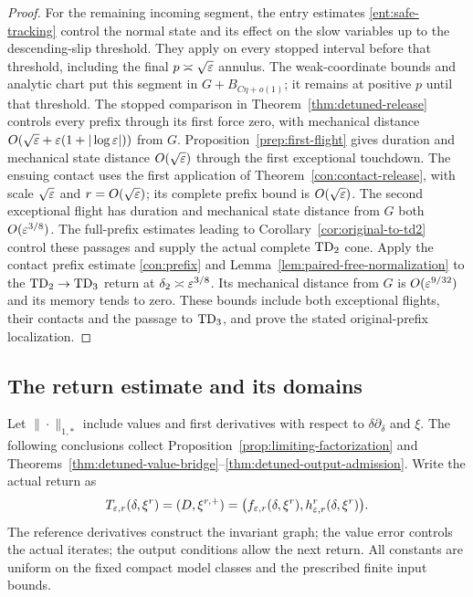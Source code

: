 \begin{proof}
For the remaining incoming segment, the entry estimates
\eqref{ent:safe-tracking} control the normal state and its effect
on the slow variables up to the descending-slip threshold.
They apply on every stopped interval before that threshold, including
the final $p\asymp\sqrt{\varepsilon}$ annulus. The weak-coordinate bounds
and analytic chart put this segment in $G+B_{C\eta+o(1)}$; it remains
at positive $p$ until that threshold. The stopped comparison in
Theorem~\ref{thm:detuned-release} controls every prefix through its first
force zero, with mechanical distance
$O(\sqrt{\varepsilon}+\varepsilon(1+|\log\varepsilon|))$ from $G$.
Proposition~\ref{prep:first-flight} gives duration and mechanical state
distance $O(\sqrt{\varepsilon})$ through the first exceptional touchdown.
The ensuing contact uses the first application of
Theorem~\ref{con:contact-release}, with scale $\sqrt{\varepsilon}$ and
$r=O(\sqrt{\varepsilon})$; its complete prefix bound is $O(\sqrt{\varepsilon})$.
The second exceptional flight has duration and mechanical state
distance from $G$ both $O(\varepsilon^{3/8})$. The full-prefix estimates
leading to Corollary~\ref{cor:original-to-td2} control these passages
and supply the actual complete $\mathrm{TD}_2$ cone.
Apply the contact prefix estimate \eqref{con:prefix} and
Lemma~\ref{lem:paired-free-normalization} to the
$\mathrm{TD}_2\to\mathrm{TD}_3$ return at $\delta_2\asymp\varepsilon^{3/8}$.
Its mechanical distance from $G$ is $O(\varepsilon^{9/32})$ and its memory
tends to zero. These bounds include both exceptional flights, their
contacts and the passage to $\mathrm{TD}_3$, and prove the stated original-prefix
localization.

\end{proof}

\subsection{The return estimate and its domains}

Let $\|\cdot\|_{1,*}$ include values and first derivatives with
respect to $\delta\partial_\delta$ and $\xi$.
The following conclusions collect
Proposition~\ref{prop:limiting-factorization} and
Theorems~\ref{thm:detuned-value-bridge}--\ref{thm:detuned-output-admission}.
Write the actual return as
\[
 T_{\varepsilon,r}(\delta,\xi^r)=(D,\xi^{r,+})
   =\bigl(f_{\varepsilon,r}(\delta,\xi^r),h_{\varepsilon,r}^r(\delta,\xi^r)\bigr).
\]
The reference derivatives construct the invariant graph; the value
error controls the actual iterates; the output conditions allow the
next return. All constants are uniform on the fixed compact model
classes and the prescribed finite input bounds.

